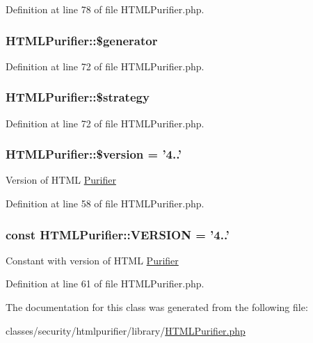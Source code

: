 Definition at line 78 of file H\+T\+M\+L\+Purifier.\+php.

\hypertarget{classHTMLPurifier_ae3fac678235d4807eb71825f5a45d3d8}{
\subsubsection[{\$generator}]{\setlength{\rightskip}{0pt plus 5cm}H\+T\+M\+L\+Purifier\+::\$generator}}\label{classHTMLPurifier_ae3fac678235d4807eb71825f5a45d3d8}


Definition at line 72 of file H\+T\+M\+L\+Purifier.\+php.

\hypertarget{classHTMLPurifier_a43bcd3ebc364d2fe66b412df5ce03200}{
\subsubsection[{\$strategy}]{\setlength{\rightskip}{0pt plus 5cm}H\+T\+M\+L\+Purifier\+::\$strategy\hspace{0.3cm}{\ttfamily [protected]}}}\label{classHTMLPurifier_a43bcd3ebc364d2fe66b412df5ce03200}


Definition at line 72 of file H\+T\+M\+L\+Purifier.\+php.

\hypertarget{classHTMLPurifier_a1950375d91cbecb0260bbfc4eca926f0}{
\subsubsection[{\$version}]{\setlength{\rightskip}{0pt plus 5cm}H\+T\+M\+L\+Purifier\+::\$version = '4..'}}\label{classHTMLPurifier_a1950375d91cbecb0260bbfc4eca926f0}
Version of H\+T\+M\+L \hyperlink{classPurifier}{Purifier} 

Definition at line 58 of file H\+T\+M\+L\+Purifier.\+php.

\hypertarget{classHTMLPurifier_a0c6a00193ac814390551621656389a67}{
\subsubsection[{V\+E\+R\+S\+I\+O\+N}]{\setlength{\rightskip}{0pt plus 5cm}const H\+T\+M\+L\+Purifier\+::\+V\+E\+R\+S\+I\+O\+N = '4..'}}\label{classHTMLPurifier_a0c6a00193ac814390551621656389a67}
Constant with version of H\+T\+M\+L \hyperlink{classPurifier}{Purifier} 

Definition at line 61 of file H\+T\+M\+L\+Purifier.\+php.



The documentation for this class was generated from the following file\+:\begin{DoxyCompactItemize}
\item 
classes/security/htmlpurifier/library/\hyperlink{HTMLPurifier_8php}{H\+T\+M\+L\+Purifier.\+php}\end{DoxyCompactItemize}
